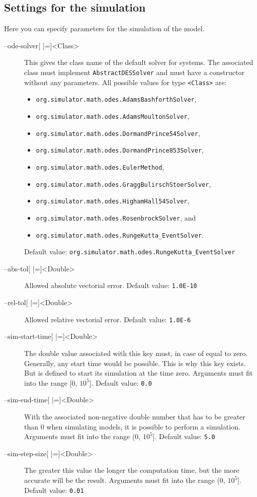 \subsection{Settings for the simulation}
Here you can specify parameters for the simulation of the model.
\begin{description}
\item[--ode-solver{[} |={]}<Class>]
          This gives the class name of the default solver for \ODE
          systems. The associated class must
          implement \texttt{AbstractDESSolver} and must have a constructor without
          any parameters.
          All possible values for type \texttt{<Class>} are:
          \begin{itemize}
          \item\texttt{org.simulator.math.odes.AdamsBashforthSolver},
          \item\texttt{org.simulator.math.odes.AdamsMoultonSolver},
          \item\texttt{org.simulator.math.odes.DormandPrince54Solver},
          \item\texttt{org.simulator.math.odes.DormandPrince853Solver},
          \item\texttt{org.simulator.math.odes.EulerMethod},
          \item\texttt{org.simulator.math.odes.GraggBulirschStoerSolver},
          \item\texttt{org.simulator.math.odes.HighamHall54Solver},
          \item\texttt{org.simulator.math.odes.RosenbrockSolver}, and
          \item\texttt{org.simulator.math.odes.RungeKutta\_EventSolver}.
          \end{itemize}
          Default value: \texttt{org.simulator.math.odes.RungeKutta\_EventSolver}
\item[--abs-tol{[} |={]}<Double>] Allowed absolute vectorial error.
          Default value: \texttt{1.0E-10}
\item[--rel-tol{[} |={]}<Double>] Allowed relative vectorial error.
          Default value: \texttt{1.0E-6}
\item[--sim-start-time{[} |={]}<Double>]
          The double value associated with this key must, in case of \SBML
          equal to zero. Generally, any start time would be possible.
          This is why this key exists. But \SBML is defined to start its
          simulation at the time zero.
          Arguments must fit into the range {[}0, $10^5${]}.
          Default value: \texttt{0.0}
\item[--sim-end-time{[} |={]}<Double>]
          With the associated non-negative double number that has to be
          greater than 0 when simulating \SBML models, it is possible to
          perform a simulation.
          Arguments must fit into the range (0, $10^5${]}.
          Default value: \texttt{5.0}
\item[--sim-step-size{[} |={]}<Double>]
          The greater this value the longer the computation time, but the
          more accurate will be the result.
          Arguments must fit into the range (0, $10^5${]}.
          Default value: \texttt{0.01}
\end{description}

